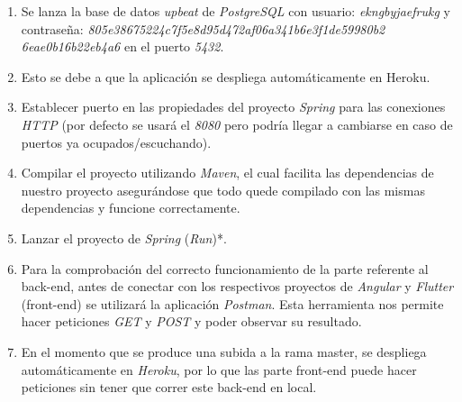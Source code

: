 \documentclass{article}
\begin{document}
\begin{enumerate}
	\item Se lanza la base de datos \textit{upbeat} de \textit{PostgreSQL} con usuario: \textit{ekngbyjaefrukg} y contraseña: \textit{805e38675224c7f5e8d95d472af06a341b6e3f1de59980b2\\6eae0b16b22eb4a6} en el puerto \textit{5432}.
	\item Esto se debe a que la aplicación se despliega automáticamente en Heroku.
	\item Establecer puerto en las propiedades del proyecto \textit{Spring} para las conexiones \textit{HTTP} (por defecto se usará el \textit{8080} pero podría llegar a cambiarse en caso de puertos ya ocupados/escuchando).
	\item Compilar el proyecto utilizando \textit{Maven}, el cual facilita las dependencias de nuestro proyecto asegurándose que todo quede compilado con las mismas dependencias y funcione correctamente.
	\item Lanzar el proyecto de \textit{Spring} (\textit{Run})*.
	\item Para la comprobación del correcto funcionamiento de la parte referente al back-end, antes de conectar con los respectivos proyectos de \textit{Angular} y \textit{Flutter} (front-end) se utilizará la aplicación \textit{Postman}. Esta herramienta nos permite hacer peticiones \textit{GET} y \textit{POST} y poder observar su resultado.
	\item En el momento que se produce una subida a la rama master, se despliega automáticamente en \textit{Heroku}, por lo que las parte front-end puede hacer peticiones sin tener que correr este back-end en local.
\end{enumerate}
\end{document}
